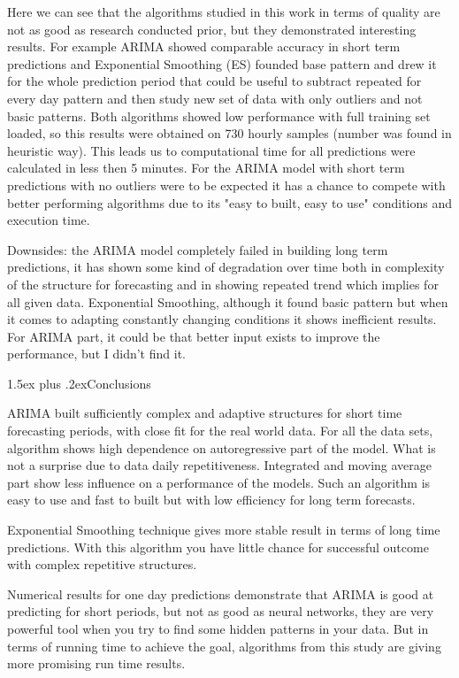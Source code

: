 \documentclass[12pt,a4paper]{article}
\makeatletter
\renewcommand{\section}{\@startsection{section}{1}{18pt}{3.25ex plus 1ex minus 0.2ex}%
{1.5ex plus .2ex}{\bfseries\rmfamily\Large}}
\theoremstyle{myplain}
\numberwithin{equation}{section}
\makeatother
\begin{document}
Here we can see that the algorithms studied in this work in terms of quality are not as good as research conducted prior, but they demonstrated interesting results. For example ARIMA showed comparable accuracy in short term predictions and Exponential Smoothing (ES) founded base pattern and drew it for the whole prediction period that could be useful to subtract repeated for every day pattern and then study new set of data with only outliers and not basic patterns. Both algorithms showed low performance with full training set loaded, so this results were obtained on 730 hourly samples (number was found in heuristic way). This leads us to computational time for all predictions were calculated in less then 5 minutes. For the ARIMA model with short term predictions with no outliers were to be expected it has a chance to compete with better performing algorithms due to its "easy to built, easy to use" conditions and execution time. 

Downsides: the ARIMA model completely failed in building long term predictions, it has shown some kind of degradation over time both in complexity of the structure for forecasting and in showing repeated trend which implies for all given data. Exponential Smoothing, although it found basic pattern but when it comes to adapting constantly changing conditions it shows inefficient results. For ARIMA part, it could be that better input exists to improve the performance, but I didn't find it.

\section{Conclusions}

ARIMA built sufficiently complex and adaptive structures for short time forecasting periods, with close fit for the real world data. For all the data sets, algorithm shows high dependence on autoregressive part of the model. What is not a surprise due to data daily repetitiveness. Integrated and moving average part show less influence on a performance of the models. Such an algorithm is easy to use and fast to built but with low efficiency for long term forecasts.

Exponential Smoothing technique gives more stable result in terms of long time predictions. With this algorithm you have little chance for successful outcome with complex repetitive structures.

Numerical results for one day predictions demonstrate that ARIMA is good at predicting for short periods, but not as good as neural networks, they are very powerful tool when you try to find some hidden patterns in your data. But in terms of running time to achieve the goal, algorithms from this study are giving more promising run time results.
\end{document}
